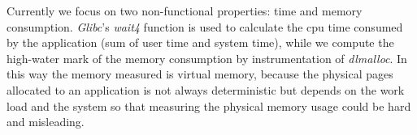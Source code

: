 Currently we focus on two non-functional properties: time and memory consumption. \emph{Glibc}'s \emph{wait4} function is used to calculate the cpu time consumed by the application (sum of user time and system time), while we compute the high-water mark of the memory consumption by instrumentation of \emph{dlmalloc}. In this way the memory measured is virtual memory, because the physical pages allocated to an application is not always deterministic but depends on the work load and the system so that measuring the physical memory usage could be hard and misleading.


